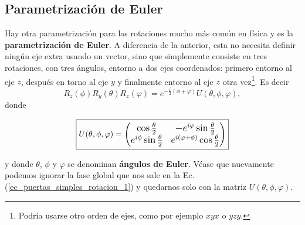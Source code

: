 \documentclass[a4paper,11pt]{book} %
\numberwithin{equation}{chapter}
\def\lp{\left(}
\def\rp{\right)}
\begin{document}
        \subsection{Parametrización de Euler} \label{sec_subsub_puertas_euler}
        
Hay otra parametrización para las rotaciones mucho más común en física y es la \textbf{parametrización de Euler}. A diferencia de la anterior, esta no necesita definir ningún eje extra usando un vector, sino que simplemente consiste en tres rotaciones, con tres ángulos, entorno a dos ejes coordenados: primero entorno al eje $z$, después en torno al eje $y$ y finalmente entorno al eje $z$ otra vez\footnote{Podría usarse otro orden de ejes, como por ejemplo $xyx$ o $yzy$.}. Es decir
	\begin{equation} \label{ec_puertas_simples_rotacion_1}
	R_z(\phi) R_y (\theta) R_z(\varphi) = e^{- \frac{i}{2} (\phi + \varphi)} U (\theta, \phi, \varphi),
	\end{equation}
donde 
	
	\begin{equation} \label{ec_puertas_simples_rotacion_U}
	\boxed{U (\theta, \phi, \varphi) = \large{ \lp \begin{matrix}
	\cos \frac{\theta}{2}                &  - e^{i\varphi} \sin \frac{\theta}{2} \\
	e^{i \phi} \sin \frac{\theta}{2}     &  e^{i (\varphi + \phi)} \cos \frac{\theta}{2}
	\end{matrix} \rp}}
	\end{equation}

y donde $\theta$, $\phi$ y $\varphi$ se denominan \textbf{ángulos de Euler}. Véase que nuevamente podemos ignorar la fase global que nos sale en la Ec. (\ref{ec_puertas_simples_rotacion_1}) y quedarnos solo con la matriz $U (\theta, \phi, \varphi)$.
\end{document}
